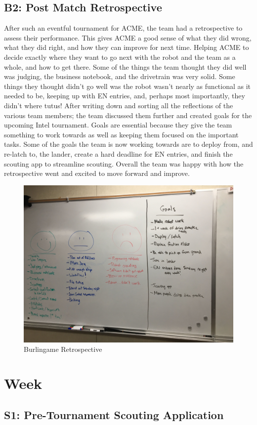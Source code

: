 \documentclass{article}
\begin{document}
\subsection{B2: Post Match Retrospective}

After such an eventful tournament for ACME, the team had a retrospective to assess their performance. This gives ACME a good sense of what they did wrong, what they did right, and how they can improve for next time. Helping ACME to decide exactly where they want to go next with the robot and the team as a whole, and how to get there. Some of the things the team thought they did well was judging, the business notebook, and the drivetrain was very solid. Some things they thought didn’t go well was the robot wasn’t nearly as functional as it needed to be, keeping up with EN entries, and, perhaps most importantly, they didn’t where tutus! After writing down and sorting all the reflections of the various team members; the team discussed them further and created goals for the upcoming Intel tournament. Goals are essential because they give the team something to work towards as well as keeping them focused on the important tasks. Some of the goals the team is now working towards are to deploy from, and re-latch to, the lander, create a hard deadline for EN entries, and finish the scouting app to streamline scouting. Overall the team was happy with how the retrospective went and excited to move forward and improve. 

\begin{figure}
    \centering
    \includegraphics[width=.6 \textwidth]{12_11-19/images/retrospective.JPG}
    \caption{Burlingame Retrospective}
    \label{fig:retrospective}
\end{figure}
\clearpage \newpage \section{Week \thesection} 
\subsection{S1: Pre-Tournament Scouting Application}
\end{document}

